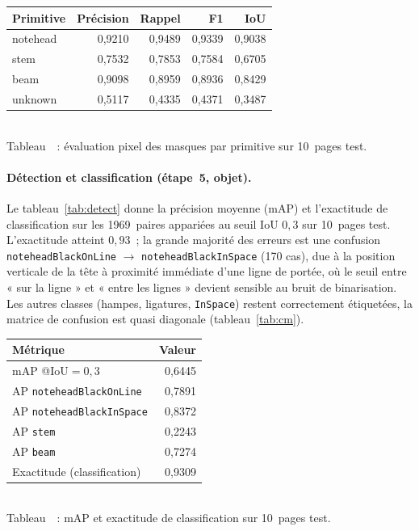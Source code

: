 \documentclass[a4paper,10pt]{article}
\begin{document}
\begin{center}
\label{tab:mask}%
\renewcommand{\arraystretch}{0.95}
\setlength{\tabcolsep}{4pt}
\small
\begin{tabular}{@{}l r r r r@{}}
\hline
\textbf{Primitive} & \textbf{Précision} & \textbf{Rappel} & \textbf{F1} & \textbf{IoU} \\
\hline
notehead & 0{,}9210 & 0{,}9489 & 0{,}9339 & 0{,}9038 \\
stem     & 0{,}7532 & 0{,}7853 & 0{,}7584 & 0{,}6705 \\
beam     & 0{,}9098 & 0{,}8959 & 0{,}8936 & 0{,}8429 \\
unknown  & 0{,}5117 & 0{,}4335 & 0{,}4371 & 0{,}3487 \\
\hline
\end{tabular}\\[3pt]
Tableau~\thetable~: évaluation pixel des masques par primitive sur 10~pages test.
\end{center}

\paragraph{Détection et classification (étape~5, objet).}
Le tableau~\ref{tab:detect} donne la précision moyenne (mAP) et l'exactitude de classification sur les 1969~paires appariées au seuil IoU $0{,}3$ sur 10~pages test. L'exactitude atteint $0{,}93$~; la grande majorité des erreurs est une confusion \texttt{noteheadBlackOnLine} $\to$ \texttt{noteheadBlackInSpace} (170 cas), due à la position verticale de la tête à proximité immédiate d'une ligne de portée, où le seuil entre « sur la ligne » et « entre les lignes » devient sensible au bruit de binarisation. Les autres classes (hampes, ligatures, \texttt{InSpace}) restent correctement étiquetées, la matrice de confusion est quasi diagonale (tableau~\ref{tab:cm}).

\begin{center}
\label{tab:detect}%
\renewcommand{\arraystretch}{0.95}
\setlength{\tabcolsep}{4pt}
\small
\begin{tabular}{@{}l r@{}}
\hline
\textbf{Métrique} & \textbf{Valeur} \\
\hline
mAP @IoU$=0{,}3$                      & 0{,}6445 \\
\quad AP \texttt{noteheadBlackOnLine}  & 0{,}7891 \\
\quad AP \texttt{noteheadBlackInSpace} & 0{,}8372 \\
\quad AP \texttt{stem}                 & 0{,}2243 \\
\quad AP \texttt{beam}                & 0{,}7274 \\
\hline
Exactitude (classification)            & 0{,}9309 \\
\hline
\end{tabular}\\[3pt]
Tableau~\thetable~: mAP et exactitude de classification sur 10~pages test.
\end{center}
\end{document}
